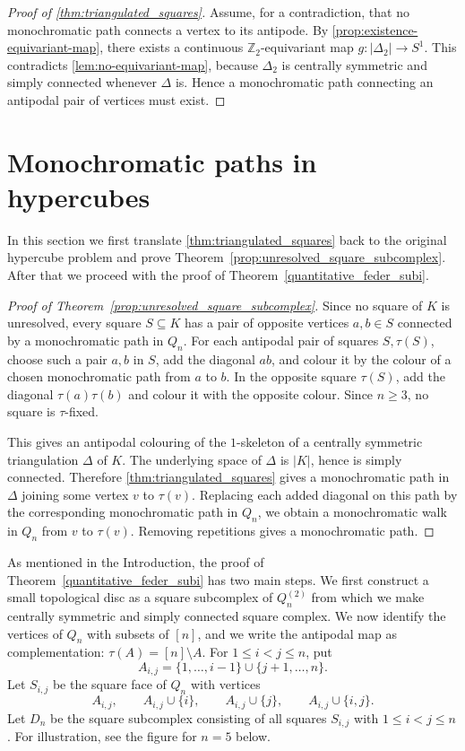 \documentclass[12pt,UKenglish]{amsart}
\theoremstyle{plain}
\theoremstyle{definition}
\theoremstyle{remark}
\begin{document}
\begin{proof}[Proof of \cref{thm:triangulated_squares}]
Assume, for a contradiction, that no monochromatic path connects a vertex to its antipode. By \cref{prop:existence-equivariant-map}, there exists a continuous $\mathbb Z_2$-equivariant map $g\colon |\Delta_2|\to S^1$. This contradicts \cref{lem:no-equivariant-map}, because $\Delta_2$ is centrally symmetric and simply connected whenever $\Delta$ is. Hence a monochromatic path connecting an antipodal pair of vertices must exist.
\end{proof}

\section{Monochromatic paths in hypercubes}

In this section we first translate \cref{thm:triangulated_squares} back to the original hypercube problem and prove Theorem~\ref{prop:unresolved_square_subcomplex}. After that we proceed with the proof of Theorem~\ref{quantitative_feder_subi}.



\begin{proof}[Proof of Theorem~\ref{prop:unresolved_square_subcomplex}]
Since no square of \(K\) is unresolved, every square \(S\subseteq K\) has a pair of opposite vertices \(a,b\in S\) connected by a monochromatic path in \(Q_n\). For each antipodal pair of squares \(S,\tau(S)\), choose such a pair \(a,b\) in \(S\), add the diagonal \(ab\), and colour it by the colour of a chosen monochromatic path from \(a\) to \(b\). In the opposite square \(\tau(S)\), add the diagonal \(\tau(a)\tau(b)\) and colour it with the opposite colour. Since $n\ge3$, no square is $\tau$-fixed.

This gives an antipodal colouring of the \(1\)-skeleton of a centrally symmetric triangulation \(\Delta\) of \(K\). The underlying space of \(\Delta\) is \(|K|\), hence is simply connected. Therefore \cref{thm:triangulated_squares} gives a monochromatic path in \(\Delta\) joining some vertex \(v\) to \(\tau(v)\). Replacing each added diagonal on this path by the corresponding monochromatic path in \(Q_n\), we obtain a monochromatic walk in \(Q_n\) from \(v\) to \(\tau(v)\). Removing repetitions gives a monochromatic path.
\end{proof}

As mentioned in the Introduction, the proof of Theorem~\ref{quantitative_feder_subi} has two main steps. We first construct a small topological disc as a square subcomplex of \(Q_n^{(2)}\) from which we make centrally symmetric and simply connected square complex. We now identify the vertices of \(Q_n\) with subsets of \([n]\), and we write the antipodal map as complementation:
\(
\tau(A)=[n]\setminus A .\) For \(1\le i<j\le n\), put
\[
A_{i,j}=\{1,\dots,i-1\}\cup\{j+1,\dots,n\}.
\]
Let \(S_{i,j}\) be the square face of \(Q_n\) with vertices
\[
A_{i,j},\qquad
A_{i,j}\cup\{i\},\qquad
A_{i,j}\cup\{j\},\qquad
A_{i,j}\cup\{i,j\}.
\]
Let \(D_n\) be the square subcomplex consisting of all squares \(S_{i,j}\) with \(1\le i<j\le n\). For illustration, see the figure for $n=5$ below.
\end{document}
